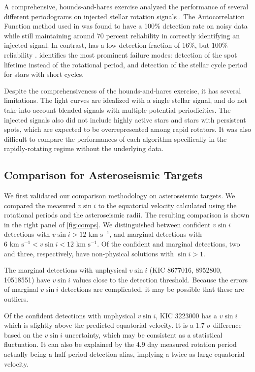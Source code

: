 \documentclass[manuscript]{aastex6}
\newcommand{\vsini}{\ensuremath{v \sin i}}
\newcommand{\kms}{\textrm{~km~s}\ensuremath{^{-1}}}
\begin{document}
A comprehensive, hounds-and-hares exercise analyzed the performance of
several different periodograms on injected stellar rotation signals 
\citep{Aigrain15}. The Autocorrelation Function method used in 
\citet{McQuillan14} was found to have a 100\% detection rate on noisy
data while still maintaining around 70 percent reliability in correctly
identifying an injected signal. In contrast, \citet{Nielsen13} has a low
detection fraction of 16\%, but 100\% reliability \citep{Aigrain15}.
\citet{Aigrain15} identifies the most prominent failure modes: detection
of the spot lifetime instead of the rotational period, and detection of
the stellar cycle period for stars with short cycles.

Despite the comprehensiveness of the hounds-and-hares exercise, it has
several limitations. The light curves are idealized with a single
stellar signal, and do not take into account blended signals with
multiple potential periodicities. The injected signals also did not
include highly active stars and stars with persistent spots, which are
expected to be overrepresented among rapid rotators. It was also
difficult to compare the performances of each algorithm specifically in
the rapidly-rotating regime without the underlying data.

\subsection{Comparison for Asteroseismic Targets}
\label{sec:astero}

We first validated our comparison methodology on asteroseismic targets. We 
compared the measured \vsini{} to the equatorial velocity calculated
using the rotational periods and the asteroseismic radii. The resulting 
comparison is shown in the right panel of \cref{fig:comps}. We distinguished 
between confident \vsini{} detections with \(\vsini > 12 \kms\), and marginal 
detections with \(6 \kms < \vsini < 12 \kms\). Of the confident and
marginal detections, two and three, respectively, have non-physical solutions 
with \(\sin i > 1\). 

The marginal detections with unphysical \vsini{} (KIC 8677016, 8952800, 10518551) 
have \vsini{} values close to the detection threshold. Because the errors of 
marginal \vsini{} detections are complicated, it may be possible that these 
are outliers. 

Of the confident detections with unphysical \vsini{}, KIC 3223000 has a
\vsini{} which is slightly above the predicted equatorial velocity. It
is a 1.7-\(\sigma\) difference based on the \vsini{} uncertainty, which
may be consistent as a statistical fluctuation. It can also
be explained by the 4.9 day measured rotation period actually being a 
half-period detection alias, implying a twice as large equatorial velocity. 
\end{document}
